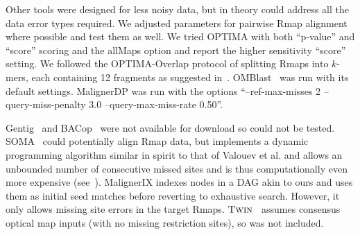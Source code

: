 Other tools were designed for less noisy data, but in theory could address all the data error types required. We adjusted parameters for pairwise Rmap alignment where possible and test them as well. We tried OPTIMA with both ``p-value'' and ``score'' scoring and the allMaps option and report the higher sensitivity ``score'' setting.  We followed the OPTIMA-Overlap protocol of splitting Rmaps into $k$-mers, each containing 12 fragments as suggested in~\cite{optima}.
OMBlast~\cite{omblast} was run with its default settings.
MalignerDP was run with the options ``--ref-max-misses 2 --query-miss-penalty 3.0 --query-max-miss-rate 0.50''.



Gentig~\cite{Anantharaman01} and BACop~\cite{Zhou09} were not available for download so could not be tested. SOMA~\cite{Nagarajan08} could potentially align Rmap data, but implements a dynamic programming algorithm similar in spirit to that of Valouev et al. and allows an unbounded number of consecutive missed sites and is thus computationally even more expensive (see~\cite{wabi2014}).  MalignerIX indexes nodes in a DAG akin to ours and uses them as initial seed matches before reverting to exhaustive search.  However, it only allows missing site errors in the target Rmaps.  $\mbox{\rm {\sc Twin}}$~\cite{wabi2014} assumes consensus optical map inputs (with no missing restriction sites), so was not included.




